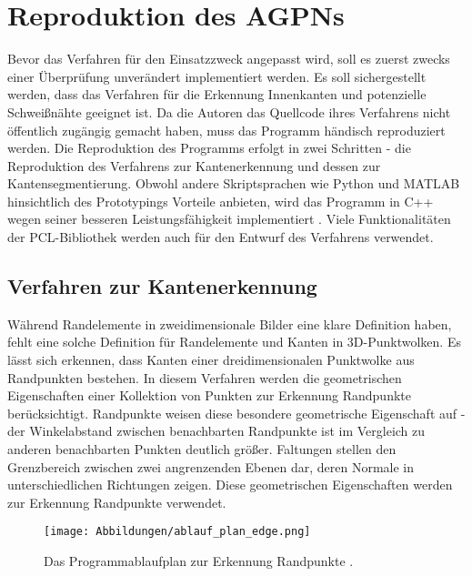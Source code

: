 \section{Reproduktion des AGPNs}
Bevor das Verfahren für den Einsatzzweck angepasst wird, soll es zuerst zwecks einer Überprüfung unverändert implementiert werden. Es soll sichergestellt werden, dass das Verfahren für die Erkennung Innenkanten und potenzielle Schweißnähte geeignet ist. Da die Autoren das Quellcode ihres Verfahrens nicht öffentlich zugängig gemacht haben, muss das Programm händisch reproduziert werden. Die Reproduktion des Programms erfolgt in zwei Schritten - die Reproduktion des Verfahrens zur Kantenerkennung und dessen zur Kantensegmentierung. Obwohl andere Skriptsprachen wie Python und MATLAB hinsichtlich des Prototypings Vorteile anbieten, wird das Programm in C++ wegen seiner besseren Leistungsfähigkeit implementiert \autocite{svensson_performance_2021}. Viele Funktionalitäten der PCL-Bibliothek \autocite{rusu_3d_2011} werden auch für den Entwurf des Verfahrens verwendet.

\subsection{Verfahren zur Kantenerkennung} \label{edge_detection_reprod}
Während Randelemente in zweidimensionale Bilder eine klare Definition haben, fehlt eine solche Definition für Randelemente und Kanten in 3D-Punktwolken. Es lässt sich erkennen, dass Kanten einer dreidimensionalen Punktwolke aus Randpunkten bestehen. In diesem Verfahren werden die geometrischen Eigenschaften einer Kollektion von Punkten zur Erkennung Randpunkte berücksichtigt. Randpunkte weisen diese besondere geometrische Eigenschaft auf - der Winkelabstand zwischen benachbarten Randpunkte ist im Vergleich zu anderen benachbarten Punkten deutlich größer. Faltungen stellen den Grenzbereich zwischen zwei angrenzenden Ebenen dar, deren Normale in unterschiedlichen Richtungen zeigen. Diese geometrischen Eigenschaften werden zur Erkennung Randpunkte verwendet. \autocite[1-2]{ni_edge_2016}

\begin{figure}[h]
	\texttt{[image: Abbildungen/ablauf\_plan\_edge.png]}
	\centering
	\caption{Das Programmablaufplan zur Erkennung Randpunkte \autocite{ni_edge_2016}.}
	\label{flow_chart}
\end{figure}

